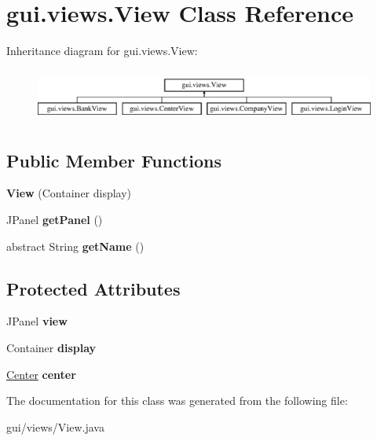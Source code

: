 \hypertarget{classgui_1_1views_1_1_view}{}\section{gui.\+views.\+View Class Reference}
\label{classgui_1_1views_1_1_view}
Inheritance diagram for gui.\+views.\+View\+:\begin{figure}[H]
\begin{center}
\leavevmode
\includegraphics[height=1.772152cm]{classgui_1_1views_1_1_view}
\end{center}
\end{figure}
\subsection*{Public Member Functions}
\begin{DoxyCompactItemize}
\item 
\mbox{\label{classgui_1_1views_1_1_view_a8484a1ea97e59db45fe8b9c5d87ee7cb}} 
{\bfseries View} (Container display)
\item 
\mbox{\label{classgui_1_1views_1_1_view_a44966bc8962ce254d54b6378caa06460}} 
J\+Panel {\bfseries get\+Panel} ()
\item 
\mbox{\label{classgui_1_1views_1_1_view_a3cdad1416bdab94eeecb54edef240c61}} 
abstract String {\bfseries get\+Name} ()
\end{DoxyCompactItemize}
\subsection*{Protected Attributes}
\begin{DoxyCompactItemize}
\item 
\mbox{\label{classgui_1_1views_1_1_view_a7c42ea37c4adb29a4a6fa3ccdf1eda3a}} 
J\+Panel {\bfseries view}
\item 
\mbox{\label{classgui_1_1views_1_1_view_afa04b0bb1ba47754aea3b33fcdd3f370}} 
Container {\bfseries display}
\item 
\mbox{\label{classgui_1_1views_1_1_view_a808545454ed54decb8b118076709ea3d}} 
\mbox{\hyperlink{classmodules_1_1center_1_1_center}{Center}} {\bfseries center}
\end{DoxyCompactItemize}


The documentation for this class was generated from the following file\+:\begin{DoxyCompactItemize}
\item 
gui/views/View.\+java\end{DoxyCompactItemize}
